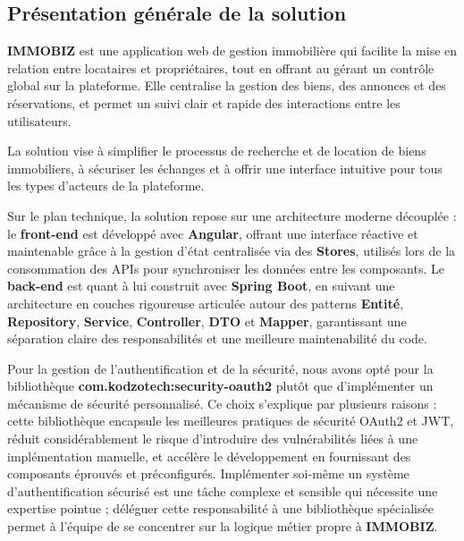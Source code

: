 \documentclass[12pt,a4paper]{report}
\newcommand{\motcle}[1]{\textcolor{marine}{\textbf{#1}}}
\newcommand{\important}[1]{\textcolor{cuivre}{\textbf{#1}}}
\begin{document}
\subsection{Présentation générale de la solution}
\begin{highlightbox}
\motcle{IMMOBIZ} est une application web de gestion immobilière qui facilite 
la mise en relation entre locataires et propriétaires, tout en offrant au gérant un contrôle global sur la plateforme. Elle centralise la gestion des biens, des annonces et des réservations, et permet un suivi clair et rapide des interactions entre les utilisateurs.

\vspace{0.3cm}

La solution vise à simplifier le processus de recherche et de location de biens immobiliers, à sécuriser les échanges et à offrir une interface intuitive pour tous les types d'acteurs de la plateforme. %


\vspace{0.3cm}
Sur le plan technique, la solution repose sur une architecture moderne 
découplée : le \important{front-end} est développé avec \motcle{Angular}, 
offrant une interface réactive et maintenable grâce à la gestion d'état 
centralisée via des \important{Stores}, utilisés lors de la consommation des 
APIs pour synchroniser les données entre les composants. Le \important{back-end} 
est quant à lui construit avec \motcle{Spring Boot}, en suivant une 
architecture en couches rigoureuse articulée autour des patterns 
\important{Entité}, \important{Repository}, \important{Service}, 
\important{Controller}, \important{DTO} et \important{Mapper}, garantissant 
une séparation claire des responsabilités et une meilleure maintenabilité 
du code.

\vspace{0.3cm}

Pour la gestion de l'authentification et de la sécurité, nous avons opté 
pour la bibliothèque \motcle{com.kodzotech:security-oauth2} plutôt que 
d'implémenter un mécanisme de sécurité personnalisé. Ce choix s'explique 
par plusieurs raisons : cette bibliothèque encapsule les meilleures 
pratiques de sécurité OAuth2 et JWT, réduit considérablement le risque 
d'introduire des vulnérabilités liées à une implémentation manuelle, et 
accélère le développement en fournissant des composants éprouvés et 
préconfigurés. Implémenter soi-même un système d'authentification sécurisé 
est une tâche complexe et sensible qui nécessite une expertise pointue ; 
déléguer cette responsabilité à une bibliothèque spécialisée permet à 
l'équipe de se concentrer sur la logique métier propre à \motcle{IMMOBIZ}.
\end{highlightbox}
\end{document}
